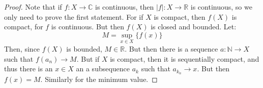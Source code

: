 \documentclass[crop=false,class=book,oneside]{standalone}                      %
\begin{document}
            \begin{proof}
                Note that if $f:X\rightarrow\mathbb{C}$ is
                continuous, then $|f|:X\rightarrow\mathbb{R}$ is
                continuous, so we only need to prove the first
                statement. For if $X$ is compact, then $f(X)$ is
                compact, for $f$ is continuous. But then $f(X)$
                is closed and bounded. Let:
                \begin{equation}
                    M=\underset{x\in{X}}\sup\{f(x)\}
                \end{equation}
                Then, since $f(X)$ is bounded, $M\in\mathbb{R}$.
                But then there is a sequence
                $a:\mathbb{N}\rightarrow{X}$ such that
                $f(a_{n})\rightarrow{M}$. But if $X$ is
                compact, then it is sequentially compact, and
                thus there is an $x\in{X}$ an a subsequence
                $a_{k}$ such that $a_{k_{n}}\rightarrow{x}$.
                But then $f(x)=M$. Similarly for the minimum value.
            \end{proof}
\end{document}
